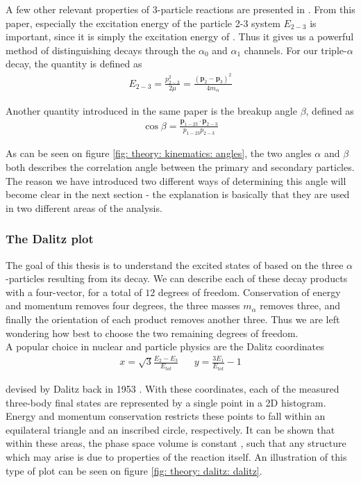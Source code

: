 A few other relevant properties of 3-particle reactions are presented in \cite{Ohlsen}. From this paper, especially the excitation energy of the particle 2-3 system $E_{2-3}$ is important, since it is simply the excitation energy of . Thus it gives us a powerful method of distinguishing decays through the $\alpha_0$ and $\alpha_1$ channels. For our triple-$\alpha$ decay, the quantity is defined as
\begin{align} \label{theory: kinematics: E23}
	E_{2-3} = \frac{p^2_{2-3}}{2\mu} = \frac{(\bm{p}_2 - \bm{p}_3)^2}{4m_{\alpha}}
\end{align}

Another quantity introduced in the same paper is the breakup angle $\beta$, defined as
\begin{align} \label{theory: kinematics: theta data}
	\cos \beta = \frac{\bm{p}_{1-23} \cdot \bm{p}_{2-3}}{p_{1-23}p_{2-3}}
\end{align}

As can be seen on figure \ref{fig: theory: kinematics: angles}, the two angles $\alpha$ and $\beta$ both describes the correlation angle between the primary and secondary particles. The reason we have introduced two different ways of determining this angle will become clear in the next section - the explanation is basically that they are used in two different areas of the analysis. 

\subsubsection{The Dalitz plot}
The goal of this thesis is to understand the excited states of  based on the three $\alpha$-particles resulting from its decay. We can describe each of these decay products with a four-vector, for a total of $12$ degrees of freedom. Conservation of energy and momentum removes four degrees, the three masses $m_{\alpha}$ removes three, and finally the orientation of each product removes another three. Thus we are left wondering how best to choose the two remaining degrees of freedom. \\

A popular choice in nuclear and particle physics are the Dalitz coordinates
\begin{align} \label{theory: dalitz: xy}
	x = \sqrt{3}\frac{E_2 - E_3}{E_{tot}} && y = \frac{3E_1}{E_{tot}} - 1
\end{align}

devised by Dalitz back in 1953 \cite{Dalitz}. With these coordinates, each of the measured three-body final states are represented by a single point in a 2D histogram. Energy and momentum conservation restricts these points to fall within an equilateral triangle and an inscribed circle, respectively. It can be shown that within these areas, the phase space volume is constant \cite{Wuethrich}, such that any structure which may arise is due to properties of the reaction itself. An illustration of this type of plot can be seen on figure \ref{fig: theory: dalitz: dalitz}. \\

